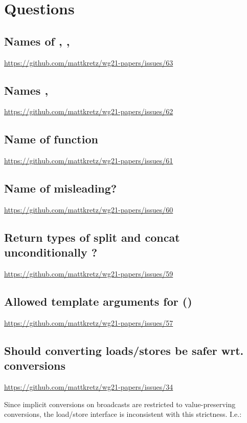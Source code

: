 \section{Questions}

\subsection{Names of , , }
\url{https://github.com/mattkretz/wg21-papers/issues/63}

\subsection{Names , }
\url{https://github.com/mattkretz/wg21-papers/issues/62}

\subsection{Name of  function}
\url{https://github.com/mattkretz/wg21-papers/issues/61}

\subsection{Name of \simdT misleading?}
\url{https://github.com/mattkretz/wg21-papers/issues/60}

\subsection{Return types of split and concat unconditionally \fixedsizeN?}
\url{https://github.com/mattkretz/wg21-papers/issues/59}

\subsection{Allowed template arguments for ()}
\url{https://github.com/mattkretz/wg21-papers/issues/57}

\subsection{Should converting loads/stores be safer wrt. conversions}
\url{https://github.com/mattkretz/wg21-papers/issues/34}

Since implicit conversions on broadcasts are restricted to value-preserving conversions, the load/store interface is inconsistent with this strictness.
I.e.:

